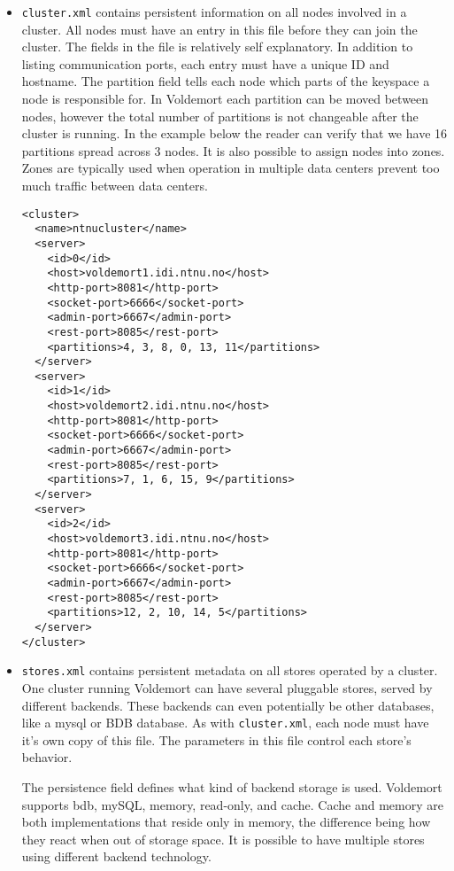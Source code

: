\begin{itemize}
\item \texttt{cluster.xml} contains persistent information on all nodes involved in a cluster. All nodes must have an entry in this file before they can join the cluster. The fields in the file is relatively self explanatory. In addition to listing communication ports, each entry must have a unique ID and hostname. The partition field tells each node which parts of the keyspace a node is responsible for. In Voldemort each partition can be moved between nodes, however the total number of partitions is not changeable after the cluster is running. In the example below the reader can verify that we have 16 partitions spread across 3 nodes. It is also possible to assign nodes into zones. Zones are typically used when operation in multiple data centers prevent too much traffic between data centers. 

\begin{verbatim}
<cluster>
  <name>ntnucluster</name>
  <server>
    <id>0</id>
    <host>voldemort1.idi.ntnu.no</host>
    <http-port>8081</http-port>
    <socket-port>6666</socket-port>
    <admin-port>6667</admin-port>
    <rest-port>8085</rest-port>
    <partitions>4, 3, 8, 0, 13, 11</partitions>
  </server>
  <server>
    <id>1</id>
    <host>voldemort2.idi.ntnu.no</host>
    <http-port>8081</http-port>
    <socket-port>6666</socket-port>
    <admin-port>6667</admin-port>
    <rest-port>8085</rest-port>
    <partitions>7, 1, 6, 15, 9</partitions>
  </server>
  <server>
    <id>2</id>
    <host>voldemort3.idi.ntnu.no</host>
    <http-port>8081</http-port>
    <socket-port>6666</socket-port>
    <admin-port>6667</admin-port>
    <rest-port>8085</rest-port>
    <partitions>12, 2, 10, 14, 5</partitions>
  </server>
</cluster>
\end{verbatim}

\item \texttt{stores.xml} contains persistent metadata on all stores operated by a cluster. One cluster running Voldemort can have several pluggable stores, served by different backends. These backends can even potentially be other databases, like a mysql or BDB database. As with \texttt{cluster.xml}, each node must have it's own copy of this file. The parameters in this file control each store's behavior. 

The persistence field defines what kind of backend storage is used. Voldemort supports bdb, mySQL, memory, read-only, and cache. Cache and memory are both implementations that reside only in memory, the difference being how they react when out of storage space. It is possible to have multiple stores using different backend technology. 


\end{itemize}
